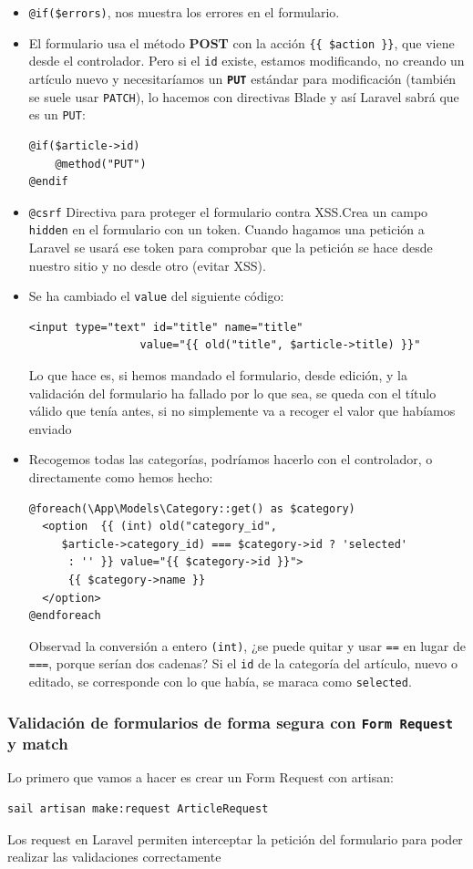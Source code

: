 \documentclass[11pt]{article}
\begin{document}
\begin{itemize}
\item \texttt{@if(\$errors)}, nos muestra los errores en el formulario.
\item El formulario usa el método \textbf{POST} con la acción \texttt{\{\{ \$action \}\}},
que viene desde el controlador. Pero si el \texttt{id} existe, estamos
modificando, no creando un artículo nuevo y necesitaríamos un \textbf{\texttt{PUT}}
estándar para modificación (también se suele usar \texttt{PATCH}), lo hacemos
con directivas Blade y así Laravel sabrá que es un \texttt{PUT}:
\begin{verbatim}
@if($article->id)
    @method("PUT")
@endif
\end{verbatim}
\item \texttt{@csrf} Directiva para proteger el formulario contra XSS.Crea un
campo \texttt{hidden} en el formulario con un token. Cuando hagamos una
petición a Laravel se usará ese token para comprobar que la petición
se hace desde nuestro sitio y no desde otro (evitar XSS).

\item Se ha cambiado el \texttt{value} del siguiente código:
\begin{verbatim}
<input type="text" id="title" name="title"
                 value="{{ old("title", $article->title) }}"
\end{verbatim}
Lo que hace es, si hemos mandado el formulario, desde edición, y la
validación del formulario ha fallado por lo que sea, se queda con el
título válido que tenía antes, si no simplemente va a recoger el
valor que habíamos enviado

\item Recogemos todas las categorías, podríamos hacerlo con el
controlador, o directamente como hemos hecho:
\begin{verbatim}
@foreach(\App\Models\Category::get() as $category)
  <option  {{ (int) old("category_id",
     $article->category_id) === $category->id ? 'selected'
      : '' }} value="{{ $category->id }}">
      {{ $category->name }}
  </option>
@endforeach
\end{verbatim}
Observad la conversión a entero \texttt{(int)}, ¿se puede quitar y usar
\texttt{==} en lugar de \texttt{===}, porque serían dos cadenas? Si el \texttt{id} de la
categoría del artículo, nuevo o editado, se corresponde con lo que
había, se maraca como \texttt{selected}.
\end{itemize}

\subsubsection{Validación de formularios de forma segura con \texttt{Form Request} y match}
\label{sec:org957abfa}
Lo primero que vamos a hacer es crear un Form Request con artisan:
\begin{verbatim}
sail artisan make:request ArticleRequest
\end{verbatim}
Los request en Laravel permiten interceptar la petición del formulario
para poder realizar las validaciones correctamente
\end{document}
